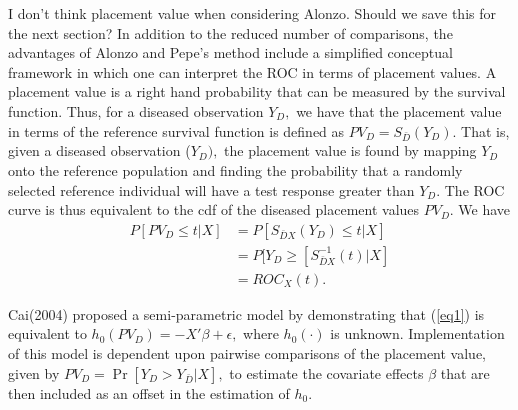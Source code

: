 \documentclass{interact}
\theoremstyle{definition}
\begin{document}
{\color{blue} I don't think placement value when considering Alonzo. Should we save this for the next section? In addition to the reduced number of comparisons, the advantages of Alonzo and Pepe's method include a simplified conceptual framework in which one can interpret the ROC in terms of placement values.  A placement value is a right hand probability that can be measured by the survival function.  Thus, for a diseased observation $Y_D,$ we have that the placement value in terms of the reference survival function is defined as $ PV_D = S_{\bar{D}}(Y_D). $  That is, given a diseased observation ($Y_D),$ the placement value is found by mapping $Y_D$ onto the reference population and finding the probability that a randomly selected reference individual will have a test response greater than $Y_D.$  The ROC curve is thus equivalent to the cdf of the diseased placement values $PV_D.$  We have
\begin{align*}
		P[PV_D \leq t | X] &= P[S_{\bar{D}X}(Y_D) \leq t |X] \\
		&=  P[Y_D \geq [S_{\bar{D}X}^{-1}(t) | X]\\
		&= ROC_{X}(t).
		\end{align*}  
}		
		
Cai(2004) proposed a semi-parametric model by demonstrating that (\ref{eq1}) is equivalent to $h_0(PV_D) = - X'\beta + \epsilon,$ where $h_0(\cdot)$ is unknown.
Implementation of this model is dependent upon pairwise comparisons of the placement value, given by $PV_D = \Pr[ Y_D > Y_{\bar D} | X],$ to estimate the covariate effects $\beta$ that are then included as an offset in the estimation of $h_0.$ \\ 

\end{document}
